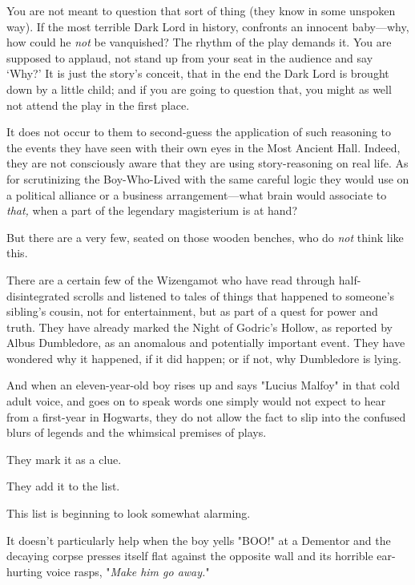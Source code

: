 You are not meant to question that sort of thing (they know in some unspoken
way). If the most terrible Dark Lord in history, confronts an innocent
baby---why, how could he \emph{not} be vanquished? The rhythm of the play
demands it. You are supposed to applaud, not stand up from your seat in the
audience and say `Why?' It is just the story's conceit, that in the end the
Dark Lord is brought down by a little child; and if you are going to question
that, you might as well not attend the play in the first place.

It does not occur to them to second-guess the application of such reasoning to
the events they have seen with their own eyes in the Most Ancient Hall. Indeed,
they are not consciously aware that they are using story-reasoning on real
life. As for scrutinizing the Boy-Who-Lived with the same careful logic they
would use on a political alliance or a business arrangement---what brain would
associate to \emph{that,} when a part of the legendary magisterium is at hand?

But there are a very few, seated on those wooden benches, who do \emph{not}
think like this.

There are a certain few of the Wizengamot who have read through
half-disintegrated scrolls and listened to tales of things that happened to
someone's sibling's cousin, not for entertainment, but as part of a quest for
power and truth. They have already marked the Night of Godric's Hollow, as
reported by Albus Dumbledore, as an anomalous and potentially important event.
They have wondered why it happened, if it did happen; or if not, why Dumbledore
is lying.

And when an eleven-year-old boy rises up and says "Lucius Malfoy" in that cold
adult voice, and goes on to speak words one simply would not expect to hear
from a first-year in Hogwarts, they do not allow the fact to slip into the
confused blurs of legends and the whimsical premises of plays.

They mark it as a clue.

They add it to the list.

This list is beginning to look somewhat alarming.

It doesn't particularly help when the boy yells "BOO!" at a Dementor and the
decaying corpse presses itself flat against the opposite wall and its horrible
ear-hurting voice rasps, "\emph{Make him go away.}"
